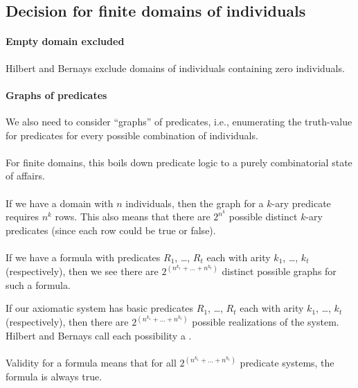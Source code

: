 \subsection{Decision for finite domains of individuals}

\paragraph{Empty domain excluded}
Hilbert and Bernays exclude domains of individuals containing zero
individuals. 

\paragraph{Graphs of predicates}
We also need to consider ``graphs'' of predicates, i.e., enumerating
the truth-value for predicates for every possible combination of
individuals.

\paragraph{}
For finite domains, this boils down predicate logic to a purely
combinatorial state of affairs.

\paragraph{}
If we have a domain with $n$ individuals, then the graph for a $k$-ary
predicate requires $n^{k}$ rows. This also means that there are
$2^{n^{k}}$ possible distinct $k$-ary predicates (since each row could
be true or false).

\paragraph{}
If we have a formula with predicates $R_{1}$, \dots, $R_{t}$ each with
arity $k_{1}$, \dots, $k_{t}$ (respectively), then we see there are
$2^{(n^{k_{1}}+\dots+n^{k_{t}})}$ distinct possible graphs for such a formula.

If our axiomatic system has basic predicates $R_{1}$, \dots, $R_{t}$ each with
arity $k_{1}$, \dots, $k_{t}$ (respectively), then there are
$2^{(n^{k_{1}}+\dots+n^{k_{t}})}$ possible realizations of the system.
Hilbert and Bernays call each possibility a .

\paragraph{}
Validity for a formula means that for all $2^{(n^{k_{1}}+\dots+n^{k_{t}})}$
predicate systems, the formula is always true.

